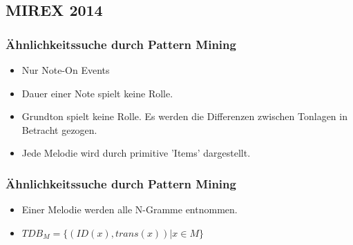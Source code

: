 \documentclass{beamer}
\begin{document}
	\subsection{MIREX 2014}
	\begin{frame}
		\frametitle{Ähnlichkeitssuche durch Pattern Mining}
		\begin{minipage}{0.45\textwidth}
			\begin{figure}[h!]
				\footnotemark
			\end{figure}
		\end{minipage}%
		\begin{minipage}{0.45\textwidth}
			\begin{itemize}
				\item Nur Note-On Events
				\item Dauer einer Note spielt keine Rolle.
				\item Grundton spielt keine Rolle. Es werden die Differenzen zwischen Tonlagen in Betracht gezogen. 
				\item Jede Melodie wird durch primitive 'Items' dargestellt.
			\end{itemize}
		\end{minipage}
	\end{frame}


	\begin{frame}
		\frametitle{Ähnlichkeitssuche durch Pattern Mining}

		\begin{itemize}
			\item Einer Melodie werden alle N-Gramme entnommen.
			\item $TDB_M =  \{ (ID(x) , trans(x)) | x \in M \}$
		\end{itemize}
	\end{frame}
\end{document}
